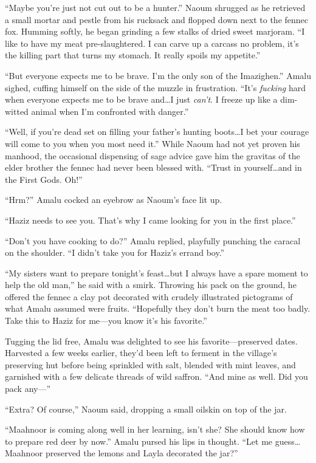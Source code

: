 ``Maybe you're just not cut out to be a hunter.'' Naoum shrugged as he retrieved a small mortar and pestle from his rucksack and flopped down next to the fennec fox. Humming softly, he began grinding a few stalks of dried sweet marjoram. ``I like to have my meat pre-slaughtered. I can carve up a carcass no problem, it's the killing part that turns my stomach. It really spoils my appetite.''

``But everyone expects me to be brave. I'm the only son of the Imazighen.'' Amalu sighed, cuffing himself on the side of the muzzle in frustration. ``It's \emph{fucking} hard when everyone expects me to be brave and\ldots I just \emph{can't}. I freeze up like a dim-witted animal when I'm confronted with danger.''

``Well, if you're dead set on filling your father's hunting boots\ldots I bet your courage will come to you when you most need it.'' While Naoum had not yet proven his manhood, the occasional dispensing of sage advice gave him the gravitas of the elder brother the fennec had never been blessed with. ``Trust in yourself\ldots and in the First Gods. Oh!''

``Hrm?'' Amalu cocked an eyebrow as Naoum's face lit up.

``Haziz needs to see you. That's why I came looking for you in the first place.''

``Don't you have cooking to do?'' Amalu replied, playfully punching the caracal on the shoulder. ``I didn't take you for Haziz's errand boy.''

``My sisters want to prepare tonight's feast\ldots but I always have a spare moment to help the old man,'' he said with a smirk. Throwing his pack on the ground, he offered the fennec a clay pot decorated with crudely illustrated pictograms of what Amalu assumed were fruits. ``Hopefully they don't burn the meat too badly. Take this to Haziz for me---you know it's his favorite.''

Tugging the lid free, Amalu was delighted to see his favorite---preserved dates. Harvested a few weeks earlier, they'd been left to ferment in the village's preserving hut before being sprinkled with salt, blended with mint leaves, and garnished with a few delicate threads of wild saffron. ``And mine as well. Did you pack any---''

``Extra? Of course,'' Naoum said, dropping a small oilskin on top of the jar.

``Maahnoor is coming along well in her learning, isn't she? She should know how to prepare red deer by now.'' Amalu pursed his lips in thought. ``Let me guess\ldots Maahnoor preserved the lemons and Layla decorated the jar?''


